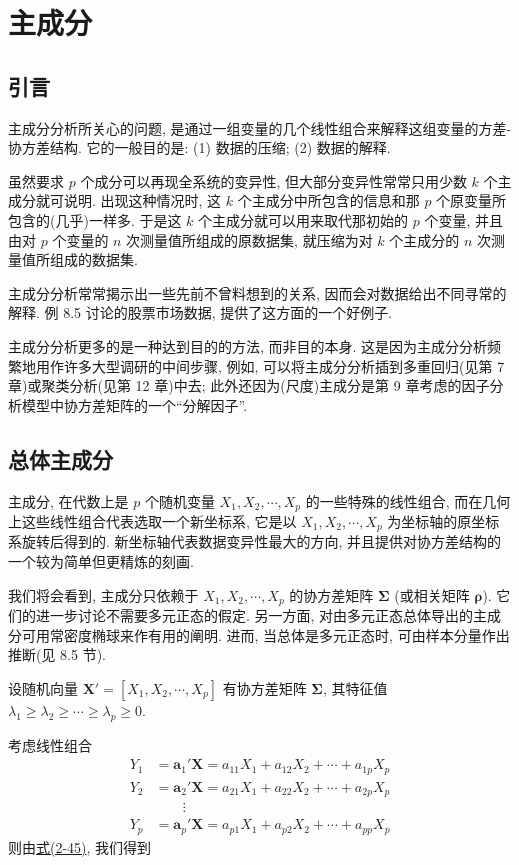 
\chapter{主成分}
\label{chap:8}

\section{引言}
\label{sec:8.1}

主成分分析所关心的问题, 是通过一组变量的几个线性组合来解释这组变量的方差-协方差结构. 它的一般目的是: (1) 数据的压缩; (2) 数据的解释.

虽然要求 $p$ 个成分可以再现全系统的变异性, 但大部分变异性常常只用少数 $k$ 个主成分就可说明. 出现这种情况时, 这 $k$ 个主成分中所包含的信息和那 $p$ 个原变量所包含的(几乎)一样多. 于是这 $k$ 个主成分就可以用来取代那初始的 $p$ 个变量, 并且由对 $p$ 个变量的 $n$ 次测量值所组成的原数据集, 就压缩为对 $k$ 个主成分的 $n$ 次测量值所组成的数据集.

主成分分析常常揭示出一些先前不曾料想到的关系, 因而会对数据给出不同寻常的解释. 例 8.5 讨论的股票市场数据, 提供了这方面的一个好例子.

主成分分析更多的是一种达到目的的方法, 而非目的本身. 这是因为主成分分析频繁地用作许多大型调研的中间步骤, 例如, 可以将主成分分析插到多重回归(见第 7 章)或聚类分析(见第 12 章)中去; 此外还因为(尺度)主成分是第 9 章考虑的因子分析模型中协方差矩阵的一个“分解因子”.

\section{总体主成分}
\label{sec:8.2}

主成分, 在代数上是 $p$ 个随机变量 $X_1,X_2,\cdots,X_p$ 的一些特殊的线性组合, 而在几何上这些线性组合代表选取一个新坐标系, 它是以 $X_1,X_2,\cdots,X_p$ 为坐标轴的原坐标系旋转后得到的. 新坐标轴代表数据变异性最大的方向, 并且提供对协方差结构的一个较为简单但更精炼的刻画.

我们将会看到, 主成分只依赖于 $X_1,X_2,\cdots,X_p$ 的协方差矩阵 $\boldsymbol{\Sigma}$ (或相关矩阵 $\boldsymbol{\rho}$). 它们的进一步讨论不需要多元正态的假定. 另一方面, 对由多元正态总体导出的主成分可用常密度椭球来作有用的阐明. 进而, 当总体是多元正态时, 可由样本分量作出推断(见 8.5 节).

设随机向量 $\mathbf{X}'=[X_1,X_2,\cdots,X_p]$ 有协方差矩阵 $\boldsymbol{\Sigma}$, 其特征值 $\lambda_1\geqslant\lambda_2\geqslant\cdots\geqslant\lambda_p\geqslant 0$.

考虑线性组合
\label{eq:8-1}
\begin{equation}
\begin{aligned}
Y_1&=\mathbf{a}_1'\mathbf{X}=a_{11}X_1+a_{12}X_2+\cdots+a_{1p}X_p\\
Y_2&=\mathbf{a}_2'\mathbf{X}=a_{21}X_1+a_{22}X_2+\cdots+a_{2p}X_p\\
&\qquad\vdots\\
Y_p&=\mathbf{a}_p'\mathbf{X}=a_{p1}X_1+a_{p2}X_2+\cdots+a_{pp}X_p
\end{aligned}
\tag{8-1}
\end{equation}
则由\hyperref[eq:2-45]{式(2-45)}, 我们得到
